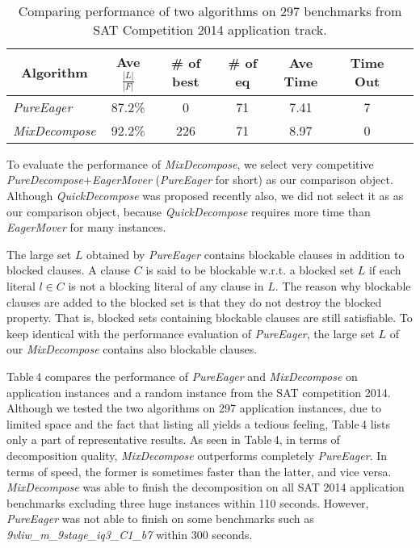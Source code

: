 \documentclass{llncs}
\begin{document}
\begin{table}
\caption{Comparing performance of two algorithms on 297 benchmarks
from SAT Competition 2014 application track.}
\begin{center}
\renewcommand{\arraystretch}{0.95}
\setlength\tabcolsep{4pt}
\begin{tabular}{|l|c|c|c|c|c|c|}
\hline  \hline
\multicolumn{1}{|c|}{Algorithm} & Ave $\frac{|L|}{|F|}$ & \# of best & \# of eq & Ave Time & Time Out \\
\hline
\emph{PureEager} &  87.2\% & 0 & 71 & 7.41 & 7 \\
\hline
\emph{MixDecompose} &  92.2\% &226 & 71 & 8.97 & 0 \\
 \hline
\end{tabular}
\end{center}
\end{table}


To evaluate the performance of \emph{MixDecompose}, we select very
competitive \emph{PureDecompose}+\emph{EagerMover} (\emph{PureEager}
for short) \cite{web:14,EagerMover:14} as our comparison object.
Although \emph{QuickDecompose} \cite{sbliter:13} was proposed
recently also,  we did not select it as as our comparison object,
because \emph{QuickDecompose} requires more time than
 \emph{EagerMover} for many instances.

   The large set $L$ obtained by \emph{PureEager} contains blockable clauses in addition to
 blocked clauses. A clause $C$ is said to be blockable w.r.t. a blocked set $L$
 if each literal $l \in C$ is not a blocking literal of any clause in $L$.
The reason why blockable clauses are added to the blocked set is
that they do not destroy the blocked property. That is, blocked sets
containing blockable clauses are still satisfiable. To keep
identical with the performance evaluation
  of \emph{PureEager}, the large set $L$ of our
  \emph{MixDecompose} contains also blockable clauses.

Table\,4 compares the performance of \emph{PureEager} and
\emph{MixDecompose} on application instances and a random instance
from the SAT competition 2014. Although we tested the two algorithms
on 297 application instances,  due to limited space and the fact
that listing all yields a tedious feeling, Table\,4 lists only a
part of representative results.  As seen in Table\,4, in terms of
decomposition quality, \emph{MixDecompose} outperforms completely
\emph{PureEager}.  In terms of speed, the former
 is sometimes faster than the latter, and vice versa. \emph{MixDecompose}
 was able to finish the decomposition on all SAT 2014 application
 benchmarks excluding three huge instances within 110 seconds.
 However, \emph{PureEager} was not able to finish on some
 benchmarks such as \emph{9vliw\_m\_9stage\_iq3\_C1\_b7} within 300
 seconds.
\end{document}
